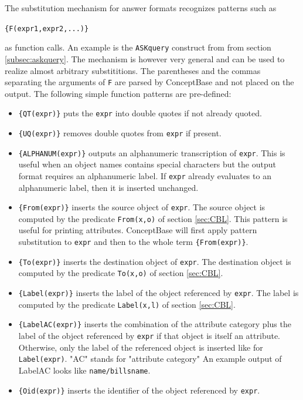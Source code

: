 The substitution mechanism for answer formats recognizes patterns such as

   \verb+{F(expr1,expr2,...)}+ 

as function calls. An example is the {\tt ASKquery}  construct from from section \ref{subsec:askquery}.
The mechanism is however very general and can be used to realize almost arbitrary substititions.
The parentheses and the commas separating the arguments of {\tt F} are parsed by ConceptBase
and not placed on the output.
The following simple function patterns are pre-defined:

\begin{itemize}

\item \verb+{QT(expr)}+ puts the {\tt expr} into double quotes if not already quoted. 

\item \verb+{UQ(expr)}+ removes double quotes from {\tt expr} if present.

\item \verb+{ALPHANUM(expr)}+ outputs an alphanumeric transcription of {\tt expr}.
This is useful when an object names contains special characters but the
output format requires an alphanumeric label. If {\tt expr} already
evaluates to an alphanumeric label, then it is inserted unchanged.

\item \verb+{From(expr)}+ inserts the source object of {\tt expr}. The source object is
computed by the predicate {\tt From(x,o)} of section \ref{sec:CBL}. This pattern
is useful for printing attributes. ConceptBase will first apply pattern substitution to
{\tt expr} and then to the whole term \verb+{From(expr)}+.

\item \verb+{To(expr)}+ inserts the destination object of {\tt expr}. The destination object is
computed by the predicate {\tt To(x,o)} of section \ref{sec:CBL}.

\item \verb+{Label(expr)}+ inserts the label of the object referenced by {\tt expr}. The label is
computed by the predicate {\tt Label(x,l)} of section \ref{sec:CBL}.

\item \verb+{LabelAC(expr)}+ inserts the combination of the attribute category plus the label of the object referenced by {\tt expr} if that object is itself an attribute. Otherwise, only the label of the referenced object is inserted like for {\tt Label(expr)}. "AC" stands for "attribute category" An example output of LabelAC looks like {\tt name/billsname}. 

\item \verb+{Oid(expr)}+ inserts the identifier of the object referenced by {\tt expr}. 
\end{itemize}

